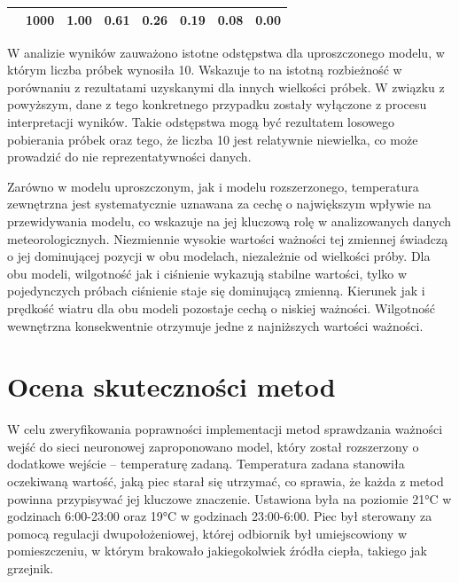 \documentclass[a4paper,twoside,12pt]{book}
\begin{document}
\begin{table}[!h]
{\begin{tabular}{|c|c|c|c|c|c|c|c|}
                                                                                   & 1000                                                   & 1.00                                                              & 0.61                                                             & 0.26                                                              & 0.19                                                      & 0.08                                                      & 0.00                                                            \\ \hline
    \end{tabular}
  }
\end{table}

W analizie wyników zauważono istotne odstępstwa dla uproszczonego modelu, w którym liczba próbek wynosiła 10. Wskazuje to na istotną rozbieżność w porównaniu z rezultatami uzyskanymi dla innych wielkości próbek. W związku z powyższym, dane z tego konkretnego przypadku zostały wyłączone z procesu interpretacji wyników. Takie odstępstwa mogą być rezultatem losowego pobierania próbek oraz tego, że liczba 10 jest relatywnie niewielka, co może prowadzić do nie reprezentatywności danych.

Zarówno w modelu uproszczonym, jak i modelu rozszerzonego, temperatura zewnętrzna jest systematycznie uznawana za cechę o największym wpływie na przewidywania modelu, co wskazuje na jej kluczową rolę w analizowanych danych meteorologicznych. Niezmiennie wysokie wartości ważności tej zmiennej świadczą o jej dominującej pozycji w obu modelach, niezależnie od wielkości próby. Dla obu modeli, wilgotność jak i ciśnienie wykazują stabilne wartości, tylko w pojedynczych próbach ciśnienie staje się dominującą zmienną. Kierunek jak i prędkość wiatru dla obu modeli pozostaje cechą o niskiej ważności. Wilgotność wewnętrzna konsekwentnie otrzymuje jedne z najniższych wartości ważności.

\section{Ocena skuteczności metod}
W celu zweryfikowania poprawności implementacji metod sprawdzania ważności wejść do sieci neuronowej zaproponowano model, który został rozszerzony o dodatkowe wejście – temperaturę zadaną. Temperatura zadana stanowiła oczekiwaną wartość, jaką piec starał się utrzymać, co sprawia, że każda z metod powinna przypisywać jej kluczowe znaczenie. Ustawiona była na poziomie 21°C w godzinach 6:00-23:00 oraz 19°C w godzinach 23:00-6:00. Piec był sterowany za pomocą regulacji dwupołożeniowej, której odbiornik był umiejscowiony w pomieszczeniu, w którym brakowało jakiegokolwiek źródła ciepła, takiego jak grzejnik.\\
\end{document}
